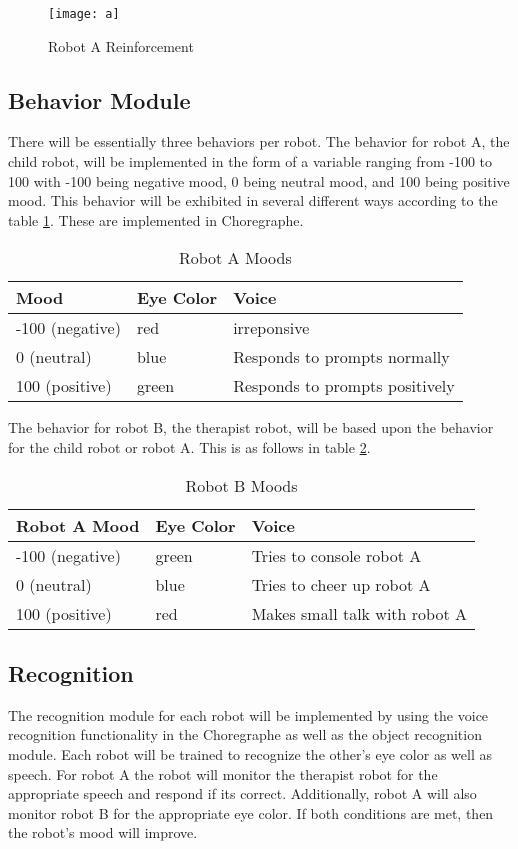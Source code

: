   \begin{figure}
    \centering
    \texttt{[image: a]}
    \caption{Robot A Reinforcement}
    \label{fig:Robot A}
  \end{figure}

  \subsection{Behavior Module}
  There will be essentially three behaviors per robot. The behavior for robot A, the child robot, will be implemented in the form of a variable ranging from -100 to 100 with -100 being negative mood, 0 being neutral mood, and 100 being positive mood. This behavior will be exhibited in several different ways according to the table \ref{tab:Robot A}. These are implemented in Choregraphe. \par 
  \begin{table}
    \centering
    \caption{Robot A Moods}
    \label{tab:Robot A}
    \begin{tabular}{| l | l | l |}
      \hline
      \textbf{Mood} & \textbf{Eye Color} & \textbf{Voice}\\
      \hline
      -100 (negative)&red&irreponsive\\
      \hline
      0 (neutral)&blue&Responds to prompts normally\\
      \hline
      100 (positive)&green&Responds to prompts positively\\
      \hline
    \end{tabular}
  \end{table}

  The behavior for robot B, the therapist robot, will be based upon the behavior for the child robot or robot A. This is as follows in table \ref{tab:Robot B}.
  \begin{table}
    \centering
    \caption{Robot B Moods}
    \label{tab:Robot B}
    \begin{tabular}{| l | l | l |}
      \hline
      \textbf{Robot A Mood} & \textbf{Eye Color} & \textbf{Voice}\\
      \hline
      -100 (negative)&green&Tries to console robot A\\
      \hline
      0 (neutral)&blue&Tries to cheer up robot A\\
      \hline
      100 (positive)&red&Makes small talk with robot A\\
      \hline
    \end{tabular}
  \end{table}
\subsection{Recognition}
The recognition module for each robot will be implemented by using the voice recognition functionality in the Choregraphe as well as the object recognition module. Each robot will be trained to recognize the other’s eye color as well as speech. For robot A the robot will monitor the therapist robot for the appropriate speech and respond if its correct. Additionally, robot A will also monitor robot B for the appropriate eye color. If both conditions are met, then the robot’s mood will improve. \par 

